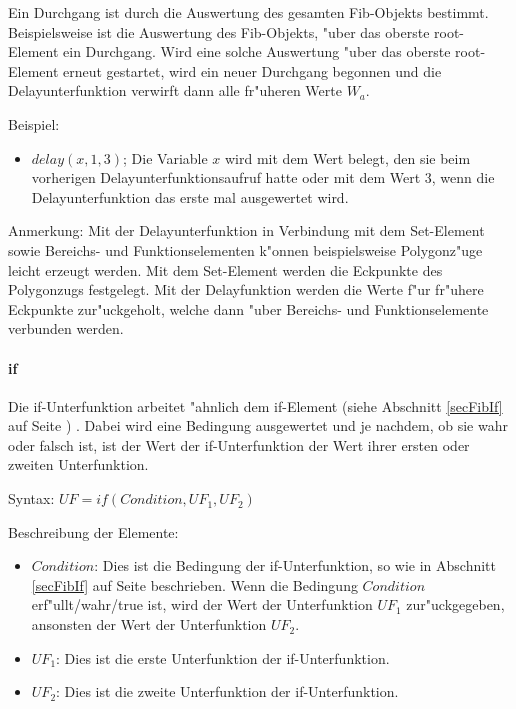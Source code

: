 Ein Durchgang ist durch die Auswertung des gesamten Fib-Objekts bestimmt. Beispielsweise ist die Auswertung des Fib-Objekts, "uber das oberste root-Element ein Durchgang. Wird eine solche Auswertung "uber das oberste root-Element erneut gestartet, wird ein neuer Durchgang begonnen und die Delayunterfunktion verwirft dann alle fr"uheren Werte $W_a$.

\bigskip\noindent
Beispiel:
\begin{itemize}
 \item $delay(x, 1, 3)$; Die Variable $x$ wird mit dem Wert belegt, den sie beim vorherigen Delayunterfunktionsaufruf hatte oder mit dem Wert $3$, wenn die Delayunterfunktion das erste mal ausgewertet wird.
\end{itemize}

\bigskip\noindent
Anmerkung:
Mit der Delayunterfunktion in Verbindung mit dem Set-Element sowie Bereichs- und Funktionselementen k"onnen beispielsweise Polygonz"uge leicht erzeugt werden. Mit dem Set-Element werden die Eckpunkte des Polygonzugs festgelegt. Mit der Delayfunktion werden die Werte f"ur fr"uhere Eckpunkte zur"uckgeholt, welche dann "uber Bereichs- und Funktionselemente verbunden werden.


\paragraph{if}

Die if-Unterfunktion arbeitet "ahnlich dem if-Element (siehe Abschnitt \ref{secFibIf} auf Seite \pageref{secFibIf}) . Dabei wird eine Bedingung ausgewertet und je nachdem, ob sie wahr oder falsch ist, ist der Wert der if-Unterfunktion der Wert ihrer ersten oder zweiten Unterfunktion.

\bigskip\noindent
Syntax:
$UF=if( Condition, UF_1, UF_2 )$


\bigskip\noindent
Beschreibung der Elemente:
\begin{itemize}
 \item $Condition$: Dies ist die Bedingung der if-Unterfunktion, so wie in Abschnitt \ref{secFibIf} auf Seite \pageref{secFibIf} beschrieben. Wenn die Bedingung $Condition$ erf"ullt/wahr/true ist, wird der Wert der Unterfunktion $UF_1$ zur"uckgegeben, ansonsten der Wert der Unterfunktion $UF_2$.
 \item $UF_1$: Dies ist die erste Unterfunktion der if-Unterfunktion.
 \item $UF_2$: Dies ist die zweite Unterfunktion der if-Unterfunktion.
\end{itemize}

